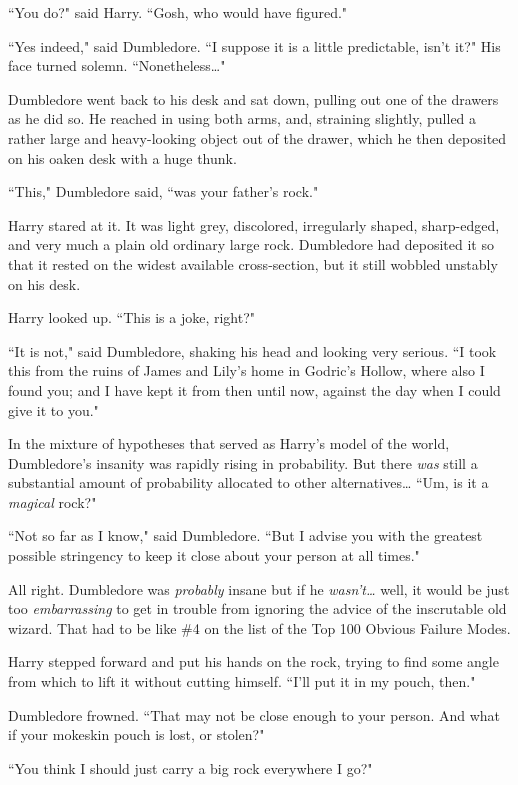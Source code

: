 ``You do?" said Harry. ``Gosh, who would have figured."

``Yes indeed," said Dumbledore. ``I suppose it is a little predictable, isn't it?" His face turned solemn. ``Nonetheless{\ldots}"

Dumbledore went back to his desk and sat down, pulling out one of the drawers as he did so. He reached in using both arms, and, straining slightly, pulled a rather large and heavy-looking object out of the drawer, which he then deposited on his oaken desk with a huge thunk.

``This," Dumbledore said, ``was your father's rock."

Harry stared at it. It was light grey, discolored, irregularly shaped, sharp-edged, and very much a plain old ordinary large rock. Dumbledore had deposited it so that it rested on the widest available cross-section, but it still wobbled unstably on his desk.

Harry looked up. ``This is a joke, right?"

``It is not," said Dumbledore, shaking his head and looking very serious. ``I took this from the ruins of James and Lily's home in Godric's Hollow, where also I found you; and I have kept it from then until now, against the day when I could give it to you."

In the mixture of hypotheses that served as Harry's model of the world, Dumbledore's insanity was rapidly rising in probability. But there \emph{was} still a substantial amount of probability allocated to other alternatives{\ldots} ``Um, is it a \emph{magical} rock?"

``Not so far as I know," said Dumbledore. ``But I advise you with the greatest possible stringency to keep it close about your person at all times."

All right. Dumbledore was \emph{probably} insane but if he \emph{wasn't{\ldots}} well, it would be just too \emph{embarrassing} to get in trouble from ignoring the advice of the inscrutable old wizard. That had to be like \#4 on the list of the Top 100 Obvious Failure Modes.

Harry stepped forward and put his hands on the rock, trying to find some angle from which to lift it without cutting himself. ``I'll put it in my pouch, then."

Dumbledore frowned. ``That may not be close enough to your person. And what if your mokeskin pouch is lost, or stolen?"

``You think I should just carry a big rock everywhere I go?"

